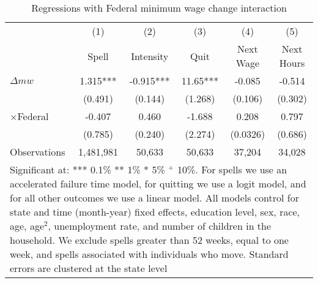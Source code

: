 \documentclass{article}
\begin{document}
\begin{table}
	\centering
	\caption{Regressions with Federal minimum wage change interaction}
	\begin{tabular}{lccccc}
		
		&  (1) &  (2) &   (3) &      (4)&      (5) \\
		&   Spell &  Intensity &   Quit &       Next Wage &      Next Hours \\
		\hline
		\hline
		$\Delta mw$ &    1.315***& -0.915*** &   11.65*** &   -0.085 &   -0.514 \\
		
		&     (0.491) &    (0.144) &     (1.268) &    (0.106) &    (0.302) \\
		
		$\times$Federal &    -0.407 &    0.460 &   -1.688 &    0.208 &   0.797 \\
		
		&    (0.785) &    (0.240) &    (2.274) &    (0.0326) &    (0.686) \\\hdashline
		
		Observations &  1,481,981 & 50,633 & 50,633 &     37,204 &     34,028 \\
		\hline
		\multicolumn{6}{p{.8\textwidth}}{{\footnotesize Significant at: *** 0.1\% ** 1\% * 5\% $^+$ 10\%. For spells we use an accelerated failure time model, for quitting we use a logit model, and for all other outcomes we use a linear model. All models control for state and time (month-year) fixed effects, education level, sex, race, age, age$^2$, unemployment rate, and number of children in the household. We exclude spells greater than 52 weeks, equal to one week, and spells associated with individuals who move. Standard errors are clustered at the state level }}\\
	\end{tabular}  
	
	\label{tab:robust_fed}
\end{table}
\end{document}
